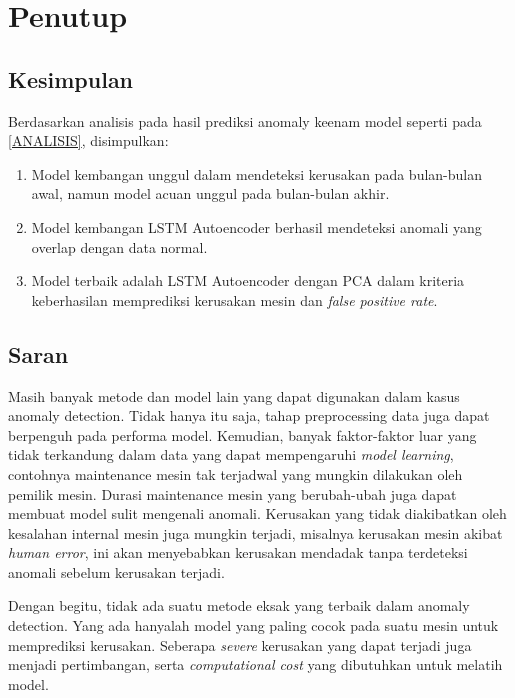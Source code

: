\chapter{Penutup}

\section{Kesimpulan}
Berdasarkan analisis pada hasil prediksi anomaly keenam model seperti pada \ref{ANALISIS}, disimpulkan:
\begin{enumerate}
    \item Model kembangan unggul dalam mendeteksi kerusakan pada bulan-bulan awal, namun model acuan unggul pada bulan-bulan akhir.
    \item Model kembangan LSTM Autoencoder berhasil mendeteksi anomali yang overlap dengan data normal.
    \item Model terbaik adalah LSTM Autoencoder dengan PCA dalam kriteria keberhasilan memprediksi kerusakan mesin dan \emph{false positive rate}.
\end{enumerate}

\section{Saran}

Masih banyak metode dan model lain yang dapat digunakan dalam kasus anomaly detection. Tidak hanya itu saja, tahap preprocessing data juga dapat berpenguh pada performa model. Kemudian, banyak faktor-faktor luar yang tidak terkandung dalam data yang dapat mempengaruhi \emph{model learning}, contohnya maintenance mesin tak terjadwal yang mungkin dilakukan oleh pemilik mesin. Durasi maintenance mesin yang berubah-ubah juga dapat membuat model sulit mengenali anomali. Kerusakan yang tidak diakibatkan oleh kesalahan internal mesin juga mungkin terjadi, misalnya kerusakan mesin akibat \emph{human error}, ini akan menyebabkan kerusakan mendadak tanpa terdeteksi anomali sebelum kerusakan terjadi.

Dengan begitu, tidak ada suatu metode eksak yang terbaik dalam anomaly detection. Yang ada hanyalah model yang paling cocok pada suatu mesin untuk memprediksi kerusakan. Seberapa \emph{severe} kerusakan yang dapat terjadi juga menjadi pertimbangan, serta \emph{computational cost} yang dibutuhkan untuk melatih model.